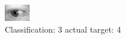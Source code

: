 \begin{figure}[h!]
\begin{center}
\includegraphics[width=0.60\columnwidth]{figures/ID695_class_3_target_4.png}
\end{center}
\caption{ Classification: 3 actual target: 4}
\label{fig:ID695_class_3_target_4}
\end{figure}

